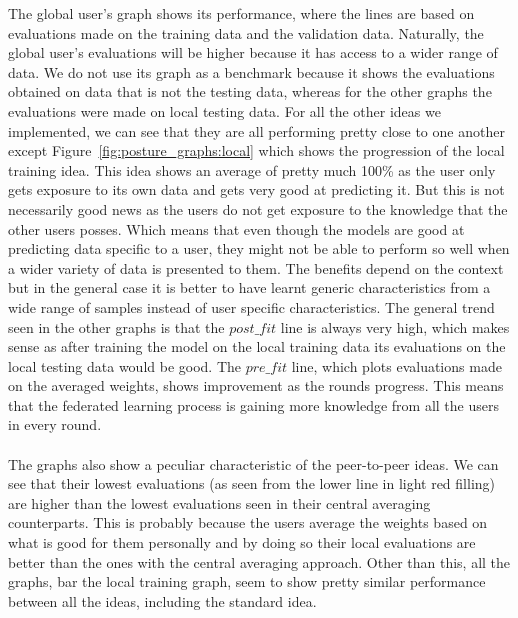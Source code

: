 \documentclass[12pt]{article}
\begin{document}
The global user's graph shows its performance, where the lines are based on evaluations made on the training data and the validation data. Naturally, the global user's evaluations will be higher because it has access to a wider range of data. We do not use its graph as a benchmark because it shows the evaluations obtained on data that is not the testing data, whereas for the other graphs the evaluations were made on local testing data. For all the other ideas we implemented, we can see that they are all performing pretty close to one another except Figure~\ref{fig:posture_graphs:local} which shows the progression of the local training idea. This idea shows an average of pretty much 100\% as the user only gets exposure to its own data and gets very good at predicting it. But this is not necessarily good news as the users do not get exposure to the knowledge that the other users posses. Which means that even though the models are good at predicting data specific to a user, they might not be able to perform so well when a wider variety of data is presented to them. The benefits depend on the context but in the general case it is better to have learnt generic characteristics from a wide range of samples instead of user specific characteristics. The general trend seen in the other graphs is that the $post\_fit$ line is always very high, which makes sense as after training the model on the local training data its evaluations on the local testing data would be good. The $pre\_fit$ line, which plots evaluations made on the averaged weights, shows improvement as the rounds progress. This means that the federated learning process is gaining more knowledge from all the users in every round. 
\\\\
The graphs also show a peculiar characteristic of the peer-to-peer ideas. We can see that their lowest evaluations (as seen from the lower line in light red filling) are higher than the lowest evaluations seen in their central averaging counterparts. This is probably because the users average the weights based on what is good for them personally and by doing so their local evaluations are better than the ones with the central averaging approach. Other than this, all the graphs, bar the local training graph, seem to show pretty similar performance between all the ideas, including the standard idea.
\end{document}
